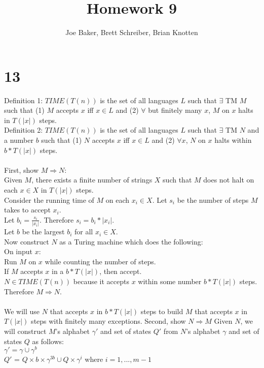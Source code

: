 \documentclass[letterpaper,notitlepage,twoside]{article}
\renewcommand{\implies}{\Rightarrow} %
\newcommand\tab[1][1cm]{\hspace*{#1}} %
\begin{document}
\title{Homework 9}
\author{Joe Baker, Brett Schreiber, Brian Knotten}
\maketitle

\section*{13}
Definition 1:  $TIME(T(n))$ is the set of all languages $L$ such that $\exists$ TM $M$ such that (1) $M$ accepts $x$ iff $x \in L$ and (2) $\forall$ but finitely many $x$, $M$ on $x$ halts in $T(|x|)$ steps. \\
Definition 2: $TIME(T(n))$ is the set of all languages $L$ such that $\exists$ TM $N$ and a number $b$ such that (1) $N$ accepts $x$ iff $x \in L$ and (2) $\forall x$, $N$ on $x$ halts within $b * T(|x|)$ steps. \\ \\
First, show $M \implies N$: \\
Given $M$, there exists a finite number of strings $X$ such that $M$ does not halt on each $x \in X$ in $T(|x|)$ steps. \\
Consider the running time of $M$ on each $x_i \in X$. Let $s_i$ be the number of steps $M$ takes to accept $x_i$.\\
Let $b_i = \frac{s_i}{|x_i|}$. Therefore $s_i = b_i * |x_i|$.\\
Let $b$ be the largest $b_i$ for all $x_i \in X$.\\
Now construct $N$ as a Turing machine which does the following: \\
On input $x$: \\
	\tab Run $M$ on $x$ while counting the number of steps. \\
	\tab If $M$ accepts $x$ in a $b * T(|x|)$, then accept. \\
$N \in TIME(T(n))$ because it accepts $x$ within some number $b * T(|x|)$ steps. Therefore $M \implies N$. \\ \\
We will use $N$ that accepts $x$ in $b * T(|x|)$ steps to build $M$ that accepts $x$ in $T(|x|)$ steps with finitely many exceptions.
Second, show $N \implies M$
Given $N$, we will construct $M$'s alphabet $\gamma '$ and set of states $Q'$ from $N$'s alphabet $\gamma$ and set of states $Q$ as follows: \\
$\gamma ' = \gamma \cup \gamma^{b}$ \\
$Q'$ = $Q \times b \times \gamma^{3b} \cup Q \times \gamma^{i}$ where $i = 1, ..., m-1$
\end{document}
